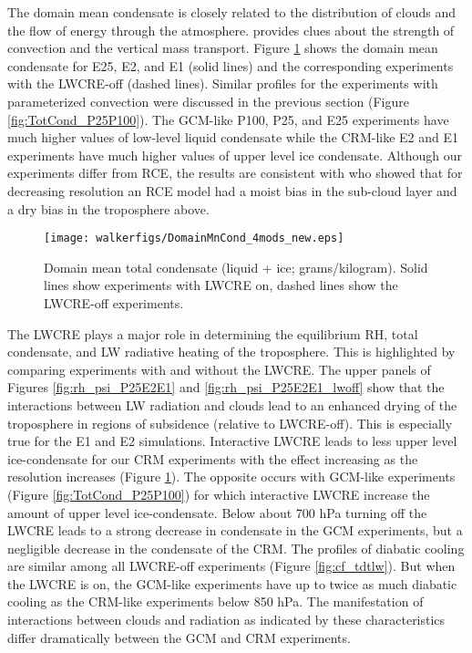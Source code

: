 \documentclass[draft]{agujournal2019}
\begin{document}
{The domain mean condensate is closely related to the distribution of clouds and the flow of energy through the atmosphere.  
 provides clues about the strength of convection and the vertical mass transport.     
Figure \ref{fig:TotCond} shows the domain mean condensate for E25, E2, and E1
(solid lines) and the corresponding experiments with the LWCRE-off (dashed lines).  Similar profiles for the experiments
with parameterized convection were discussed in the previous section (Figure \ref{fig:TotCond_P25P100}).  
The GCM-like P100, P25, and E25 experiments have much higher values of low-level liquid condensate while the CRM-like 
E2 and E1 experiments have much higher values of upper level ice condensate.  
Although our experiments differ from RCE, the results are consistent with  who showed that for 
decreasing resolution an RCE model had a moist bias in the sub-cloud layer and a dry bias in the troposphere above.  
 
\begin{figure}
  \centering
       \texttt{[image: walkerfigs/DomainMnCond\_4mods\_new.eps]}
          \caption{Domain mean total condensate (liquid + ice; grams/kilogram).  Solid lines show experiments with LWCRE on,
          dashed lines show the LWCRE-off experiments.}
  \label{fig:TotCond}
\end{figure}
 
 
The LWCRE plays a major role in determining the equilibrium RH, total condensate, and LW radiative heating of the troposphere.  
This is highlighted by comparing experiments with and without the LWCRE. 
The upper panels of Figures \ref{fig:rh_psi_P25E2E1} and \ref{fig:rh_psi_P25E2E1_lwoff} show that the 
interactions between LW radiation and clouds lead to an enhanced drying of the troposphere in regions of subsidence (relative to LWCRE-off).  
This is especially true for the E1 and E2 simulations.  
Interactive LWCRE leads to less upper level ice-condensate for our CRM experiments
with the effect increasing as the resolution increases (Figure \ref{fig:TotCond}).  
The opposite occurs with GCM-like experiments (Figure \ref{fig:TotCond_P25P100}) for which interactive LWCRE increase 
the amount of upper level ice-condensate.    
Below about 700 hPa turning off the LWCRE leads to a strong decrease in condensate
in the GCM experiments, but a negligible decrease in the condensate of the CRM.    
The profiles of diabatic cooling are similar among all LWCRE-off experiments (Figure \ref{fig:cf_tdtlw}).  
But when the LWCRE is on, the GCM-like experiments have up to twice as much diabatic cooling as the CRM-like experiments below 850 hPa.
The manifestation of interactions between clouds and radiation as indicated
by these characteristics differ dramatically between the GCM and CRM experiments.   

}
\end{document}
